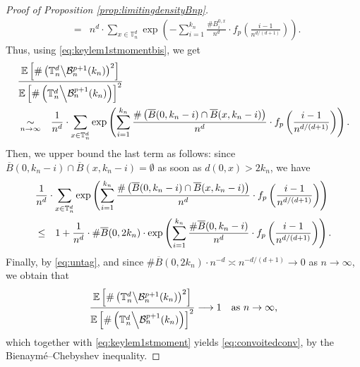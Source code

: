 \documentclass[a4paper,11pt]{article}
\begin{document}
\begin{proof}[Proof of Proposition \ref{prop:limitingdensityBnp}]
\begin{eqnarray*}
&=&n^d\cdot\sum_{x\in\mathbb{T}_n^d}\exp\left(-\sum_{i=1}^{k_n}\frac{\#B_i^{0,x}}{n^d}\cdot f_p\left(\frac{i-1}{n^{d/(d+1)}}\right)\right).
\end{eqnarray*}
Thus, using \eqref{eq:keylem1stmomentbis}, we get
\begin{eqnarray*}
\lefteqn{\frac{\mathbb{E}\left[\#\left(\mathbb{T}_n^d\middle\backslash\mathcal{B}_n^{p+1}(k_n)\right)^2\right]}{\mathbb{E}\left[\#\left(\mathbb{T}_n^d\middle\backslash\mathcal{B}_n^{p+1}(k_n)\right)\right]^2}}\\
&\underset{n\to\infty}{\sim}&\frac{1}{n^d}\cdot\sum_{x\in\mathbb{T}_n^d}\exp\left(\sum_{i=1}^{k_n}\frac{\#\left(\overline{B}(0,k_n-i)\cap\overline{B}(x,k_n-i)\right)}{n^d}\cdot f_p\left(\frac{i-1}{n^{d/(d+1)}}\right)\right).
\end{eqnarray*}
Then, we upper bound the last term as follows: since $\overline{B}(0,k_n-i)\cap\overline{B}(x,k_n-i)=\emptyset$ as soon as $d(0,x)>2k_n$, we have
\begin{eqnarray*}
\lefteqn{\frac{1}{n^d}\cdot\sum_{x\in\mathbb{T}_n^d}\exp\left(\sum_{i=1}^{k_n}\frac{\#\left(\overline{B}(0,k_n-i)\cap\overline{B}(x,k_n-i)\right)}{n^d}\cdot f_p\left(\frac{i-1}{n^{d/(d+1)}}\right)\right)}\\
&\leq&1+\frac{1}{n^d}\cdot\#\overline{B}(0,2k_n)\cdot\exp\left(\sum_{i=1}^{k_n}\frac{\#\overline{B}(0,k_n-i)}{n^d}\cdot f_p\left(\frac{i-1}{n^{d/(d+1)}}\right)\right).
\end{eqnarray*}
Finally, by \eqref{eq:untag}, and since $\#\overline{B}(0,2k_n)\cdot n^{-d}\asymp n^{-d/(d+1)}\rightarrow0$ as $n\to\infty$, we obtain that
\begin{equation*}
\frac{\mathbb{E}\left[\#\left(\mathbb{T}_n^d\middle\backslash\mathcal{B}_n^{p+1}(k_n)\right)^2\right]}{\mathbb{E}\left[\#\left(\mathbb{T}_n^d\middle\backslash\mathcal{B}_n^{p+1}(k_n)\right)\right]^2}\longrightarrow1\quad\text{as $n\to\infty$,}
\end{equation*}
which together with \eqref{eq:keylem1stmoment} yields \eqref{eq:convoitedconv}, by the Bienaymé--Chebyshev inequality.


\end{proof}
\end{document}
